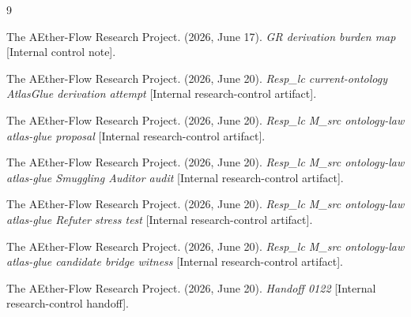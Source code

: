 \documentclass[11pt]{article}
\begin{document}
\begin{thebibliography}{9}

The AEther-Flow Research Project. (2026, June 17). \emph{GR derivation burden
map} [Internal control note].

The AEther-Flow Research Project. (2026, June 20). \emph{Resp\_lc
current-ontology AtlasGlue derivation attempt} [Internal research-control
artifact].

The AEther-Flow Research Project. (2026, June 20). \emph{Resp\_lc M\_src
ontology-law atlas-glue proposal} [Internal research-control artifact].

The AEther-Flow Research Project. (2026, June 20). \emph{Resp\_lc M\_src
ontology-law atlas-glue Smuggling Auditor audit} [Internal research-control
artifact].

The AEther-Flow Research Project. (2026, June 20). \emph{Resp\_lc M\_src
ontology-law atlas-glue Refuter stress test} [Internal research-control
artifact].

The AEther-Flow Research Project. (2026, June 20). \emph{Resp\_lc M\_src
ontology-law atlas-glue candidate bridge witness} [Internal research-control
artifact].

The AEther-Flow Research Project. (2026, June 20). \emph{Handoff 0122}
[Internal research-control handoff].

\end{thebibliography}
\end{document}
